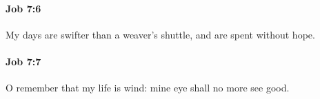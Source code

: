 		\paragraph{Job 7:6} %
			\label{JOB-7-6}

			My days are swifter than a weaver’s shuttle, and are spent without hope.


		\paragraph{Job 7:7} %
			\label{JOB-7-7}

			O remember that my life is wind: mine eye shall no more see good.


